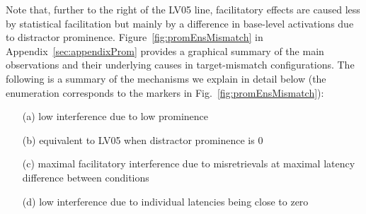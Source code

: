 \documentclass{cambridge7A}\usepackage[]{graphicx}\usepackage[]{color}
\begin{document}
Note that, further to the right of the LV05 line, facilitatory effects are caused less by statistical facilitation but mainly by a difference in base-level activations due to distractor prominence.
Figure~\ref{fig:promEnsMismatch} in Appendix~\ref{sec:appendixProm} provides a graphical summary of the main observations and their underlying causes in target-mismatch configurations. 
The following is a summary of the mechanisms we explain in detail below (the enumeration corresponds to the markers in Fig.~\ref{fig:promEnsMismatch}):
\begin{enumerate}
	\item[(a)] low interference due to low prominence
 	\item[(b)] equivalent to LV05 when distractor prominence is $0$
 	\item[(c)] maximal facilitatory interference due to misretrievals at maximal latency difference between conditions
 	\item[(d)] low interference due to individual latencies being close to zero
\end{enumerate}
\end{document}
